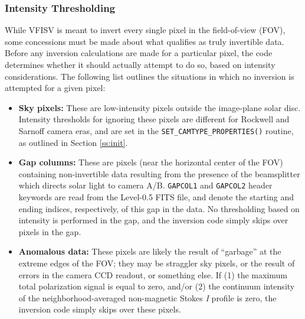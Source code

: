 \documentclass[11pt]{article}
\begin{document}
\subsubsection{Intensity Thresholding}\label{ss:thresh}
While VFISV is meant to invert every single pixel in the field-of-view (FOV), some concessions
must be made about what qualifies as truly invertible data.  Before any inversion calculations
are made for a particular pixel, the code determines whether it should actually attempt to do
so, based on intensity considerations.  The following list outlines the situations in which no
inversion is attempted for a given pixel:

\begin{itemize}
  \renewcommand\labelitemi{\scriptsize$\blacksquare$}
  \item \textbf{Sky pixels:} These are low-intensity pixels outside the image-plane solar disc.
        Intensity thresholds for ignoring these pixels are different for Rockwell and Sarnoff
        camera eras, and are set in the \texttt{SET\_CAMTYPE\_PROPERTIES()} routine, as outlined
        in Section \ref{ss:init}.
  \item \textbf{Gap columns:} These are pixels (near the horizontal center of the FOV) containing
        non-invertible data resulting from the presence of the beamsplitter which directs solar
        light to camera A/B.  \texttt{GAPCOL1} and \texttt{GAPCOL2} header keywords are read from
        the Level-0.5 FITS file, and denote the starting and ending indices, respectively, of this
        gap in the data.  No thresholding based on intensity is performed in the gap, and the
        inversion code simply skips over pixels in the gap.
  \item \textbf{Anomalous data:} These pixels are likely the result of ``garbage'' at the
        extreme edges of the FOV; they may be straggler sky pixels, or the result of errors in
        the camera CCD readout, or something else.  If (1) the maximum total polarization signal
        is equal to zero, and/or (2) the continuum intensity of the neighborhood-averaged non-magnetic
        Stokes \textit{I} profile is zero, the inversion code simply skips over these pixels.
\end{itemize}
\end{document}
